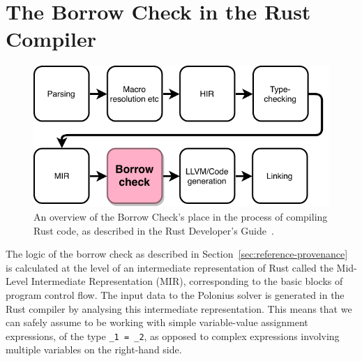 \documentclass[11pt,a4paper,twoside,openany]{report}
\newcommand{\InRust}[1]{\texttt{#1}}
\begin{document}
\section{The Borrow Check in the Rust Compiler}
\label{sec:rust-specificts}

\begin{figure}
  \includegraphics[width=0.9\linewidth]{Graphs/rustc-overview}
  \caption{An overview of the Borrow Check's place in the process of compiling
    Rust code, as described in the Rust Developer's
    Guide~\cite{rustc_developers_guide_nodate}.}
  \label{fig:rustc-overview}
\end{figure}

The logic of the borrow check as described in
Section~\ref{sec:reference-provenance} is calculated at the level of an
intermediate representation of Rust called the Mid-Level Intermediate
Representation (MIR), corresponding to the basic blocks of program control flow.
The input data to the Polonius solver is generated in the Rust compiler by
analysing this intermediate representation. This means that we can safely assume
to be working with simple variable-value assignment expressions, of the type
\InRust{_1 = _2}, as opposed to complex expressions involving multiple variables
on the right-hand side.
\end{document}
